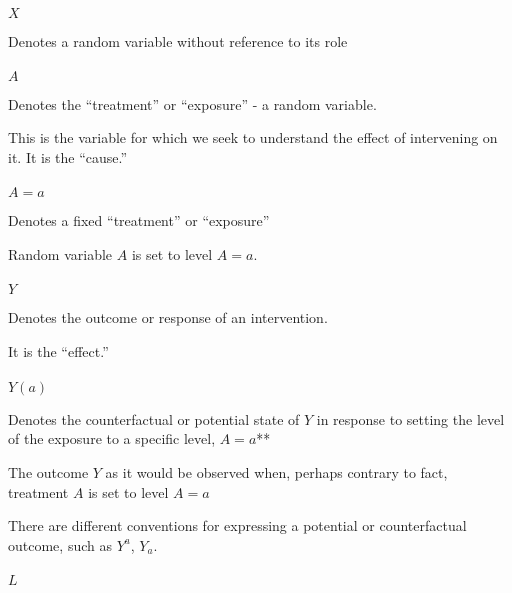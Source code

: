 \documentclass[
  single column]{article}
\makeatletter
\let\oldparagraph\paragraph
\renewcommand{\paragraph}{
    \@ifstar
      \xxxParagraphStar
      \xxxParagraphNoStar
  }
\newcommand{\xxxParagraphStar}[1]{\oldparagraph*{#1}\mbox{}}
\newcommand{\xxxParagraphNoStar}[1]{\oldparagraph{#1}\mbox{}}
\makeatother
\begin{document}
\paragraph{\texorpdfstring{\(X\)}{X}}\label{x}

Denotes a random variable without reference to its role

\paragraph{\texorpdfstring{\(A\)}{A}}\label{a}

Denotes the ``treatment'' or ``exposure'' - a random variable.

This is the variable for which we seek to understand the effect of
intervening on it. It is the ``cause.''

\paragraph{\texorpdfstring{\(A=a\)}{A=a}}\label{aa}

Denotes a fixed ``treatment'' or ``exposure''

Random variable \(A\) is set to level \(A=a\).

\paragraph{\texorpdfstring{\(Y\)}{Y}}\label{y}

Denotes the outcome or response of an intervention.

It is the ``effect.''

\paragraph{\texorpdfstring{\(Y(a)\)}{Y(a)}}\label{ya}

Denotes the counterfactual or potential state of \(Y\) in response to
setting the level of the exposure to a specific level, \(A=a\)**

The outcome \(Y\) as it would be observed when, perhaps contrary to
fact, treatment \(A\) is set to level \(A=a\)

There are different conventions for expressing a potential or
counterfactual outcome, such as \(Y^a\), \(Y_a\).

\paragraph{\texorpdfstring{\(L\)}{L}}\label{l}
\end{document}
